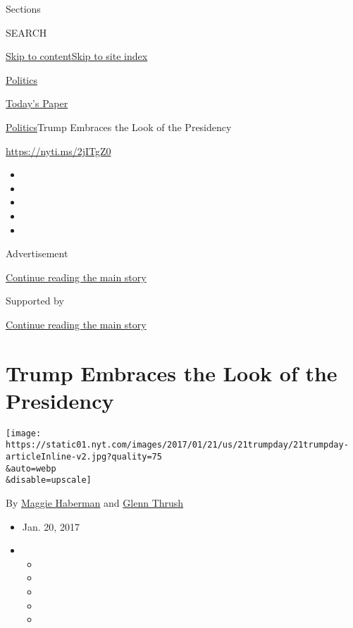 Sections

SEARCH

\protect\hyperlink{site-content}{Skip to
content}\protect\hyperlink{site-index}{Skip to site index}

\href{https://www.nytimes.com/section/politics}{Politics}

\href{https://myaccount.nytimes.com/auth/login?response_type=cookie\&client_id=vi}{}

\href{https://www.nytimes.com/section/todayspaper}{Today's Paper}

\href{/section/politics}{Politics}\textbar{}Trump Embraces the Look of
the Presidency

\url{https://nyti.ms/2jITgZ0}

\begin{itemize}
\item
\item
\item
\item
\item
\end{itemize}

Advertisement

\protect\hyperlink{after-top}{Continue reading the main story}

Supported by

\protect\hyperlink{after-sponsor}{Continue reading the main story}

\hypertarget{trump-embraces-the-look-of-the-presidency}{%
\section{Trump Embraces the Look of the
Presidency}\label{trump-embraces-the-look-of-the-presidency}}

\texttt{[image: https://static01.nyt.com/images/2017/01/21/us/21trumpday/21trumpday-articleInline-v2.jpg?quality=75\\\&auto=webp\\\&disable=upscale]}

By \href{http://www.nytimes.com/by/maggie-haberman}{Maggie Haberman} and
\href{https://www.nytimes.com/by/glenn-thrush}{Glenn Thrush}

\begin{itemize}
\item
  Jan. 20, 2017
\item
  \begin{itemize}
  \item
  \item
  \item
  \item
  \item
  \end{itemize}
\end{itemize}


